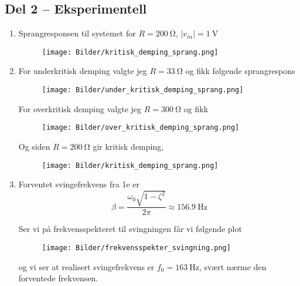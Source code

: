 \documentclass[a4paper,11pt,norsk]{article}
\begin{document}
\subsection*{Del 2 -- Eksperimentell}
\begin{enumerate}
\item Sprangresponsen til systemet for $R = \SI{200}{\ohm}$, $|v_{in}| = \SI{1}{\volt}$
    \begin{figure}[H]
        \centering
        \texttt{[image: Bilder/kritisk\_demping\_sprang.png]}
    \end{figure}

\item For underkritisk demping valgte jeg $R = \SI{33}{\ohm}$ og fikk følgende sprangrespons
    \begin{figure}[H]
        \centering
        \texttt{[image: Bilder/under\_kritisk\_demping\_sprang.png]}
    \end{figure}

    For overkritisk demping valgte jeg $R = \SI{300}{\ohm}$ og fikk
    \begin{figure}[H]
        \centering
        \texttt{[image: Bilder/over\_kritisk\_demping\_sprang.png]}
    \end{figure}

    Og siden $R = \SI{200}{\ohm}$ gir kritisk demping, 
    \begin{figure}[H]
        \centering
        \texttt{[image: Bilder/kritisk\_demping\_sprang.png]}
    \end{figure}
    
\item Forventet svingefrekvens fra 1e er
    \[
        \beta = \frac{\omega_0 \sqrt{1 - \zeta^2}}{2\pi} \approx \SI{156.9}{\hertz}
    \]

    Ser vi på frekvensspekteret til svingningen får vi følgende plot
    \begin{figure}[H]
        \centering
        \texttt{[image: Bilder/frekvensspekter\_svingning.png]}
    \end{figure}

    og vi ser at realisert svingefrekvens er $f_0 = \SI{163}{\hertz}$, svært nærme den forventede frekvensen.

\end{enumerate}
\end{document}
